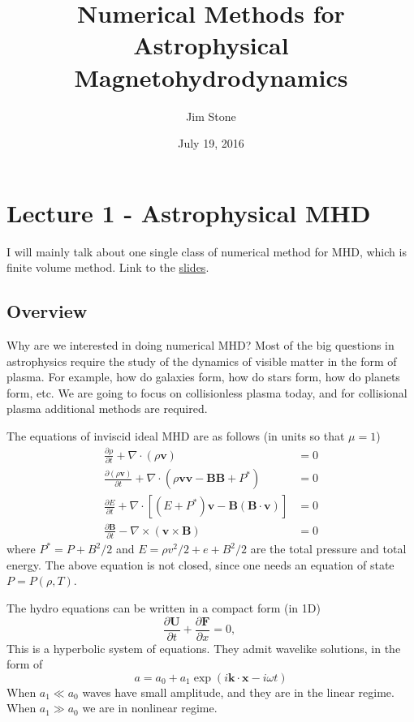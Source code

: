 \documentclass[letterpaper, 11pt]{article}
\numberwithin{equation}{section}
\numberwithin{figure}{section}
\begin{document}
\title{Numerical Methods for Astrophysical Magnetohydrodynamics}
\author{Jim Stone}
\date{July 19, 2016}

\maketitle

\section{Lecture 1 - Astrophysical MHD}

I will mainly talk about one single class of numerical method for MHD, which is
finite volume method. Link to the \href{http://www.astro.princeton.edu/~jstone/downloads/papers/Lecture1.pdf}{slides}.

\subsection{Overview}

Why are we interested in doing numerical MHD? Most of the big questions in
astrophysics require the study of the dynamics of visible matter in the form of
plasma. For example, how do galaxies form, how do stars form, how do planets
form, etc. We are going to focus on collisionless plasma today, and for
collisional plasma additional methods are required.

The equations of inviscid ideal MHD are as follows (in units so that $\mu = 1$)
\begin{align}
  \frac{\partial\rho}{\partial t} + \nabla \cdot \left( \rho \mathbf{v} \right) &= 0 \\
  \frac{\partial(\rho \mathbf{v})}{\partial t} + \nabla \cdot \left( \rho \mathbf{v}\mathbf{v} - \mathbf{B}\mathbf{B} + P^{*} \right) &= 0 \\
  \frac{\partial E}{\partial t} + \nabla\cdot \left[ (E + P^{*})\mathbf{v} - \mathbf{B}\left( \mathbf{B}\cdot \mathbf{v} \right) \right] &= 0 \\
  \frac{\partial \mathbf{B}}{\partial t} - \nabla\times (\mathbf{v}\times \mathbf{B}) &= 0
\end{align}
where $P^{*} = P + B^2/2$ and $E = \rho v^2/2 + e + B^2/2$ are the total
pressure and total energy. The above equation is not closed, since one needs an
equation of state $P = P(\rho, T)$.

The hydro equations can be written in a compact form (in 1D)
\begin{equation}
  \label{eq:1}
  \frac{\partial \mathbf{U}}{\partial t} + \frac{\partial \mathbf{F}}{\partial x} = 0,\qquad 
\end{equation}
This is a hyperbolic system of equations. They admit wavelike solutions, in the
form of
\begin{equation}
  \label{eq:2}
  a = a_0 + a_1\exp(i\mathbf{k}\cdot \mathbf{x} - i\omega t)
\end{equation}
When $a_1\ll a_0$ waves have small amplitude, and they are in the linear regime.
When $a_1\gg a_0$ we are in nonlinear regime.
\end{document}
